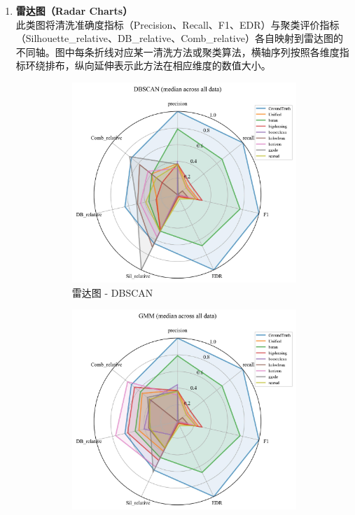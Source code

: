 \documentclass[10pt]{article} %
\numberwithin{equation}{section}
\begin{document}
\begin{enumerate}[label=(\alph*)]
    \item \textbf{雷达图（Radar Charts）} \\
    此类图将清洗准确度指标（Precision、Recall、F1、EDR）与聚类评价指标（Silhouette\_relative、DB\_relative、Comb\_relative）各自映射到雷达图的不同轴。图中每条折线对应某一清洗方法或聚类算法，横轴序列按照各维度指标环绕排布，纵向延伸表示此方法在相应维度的数值大小。
\begin{figure}[htbp]
    \centering
    \begin{subfigure}[b]{0.30\linewidth}
        \centering
        \includegraphics[width=\linewidth]{figures/radar graph/radar_DBSCAN.pdf}
        \caption{雷达图 - DBSCAN}
        \label{fig:radar_dbscan}
    \end{subfigure}
    \hfill
    \begin{subfigure}[b]{0.30\linewidth}
        \centering
        \includegraphics[width=\linewidth]{figures/radar graph/radar_GMM.pdf}

\end{subfigure}
\end{figure}
\end{enumerate}
\end{document}
